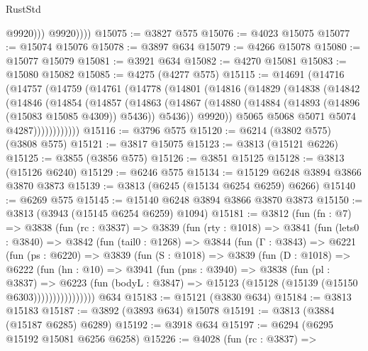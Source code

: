 \begin{lexlean}{RustStd}
\begin{coremodule}
{\begin{coremodule}
{{{{{{{{{{{{{{{{{{{{{{{{{{{{{{{{{{{                  @9920)))
            @9920))))
@15075 := @3827 @575
@15076 := @4023 @15075
@15077 := @15074 @15076
@15078 := @3897 @634
@15079 := @4266 @15078
@15080 := @15077 @15079
@15081 := @3921 @634
@15082 := @4270 @15081
@15083 := @15080 @15082
@15085 := @4275 (@4277 @575)
@15115 := @14691
    (@14716
      (@14757
        (@14759
          (@14761
            (@14778
              (@14801
                (@14816
                  (@14829
                    (@14838
                      (@14842
                        (@14846
                          (@14854
                            (@14857
                              (@14863
                                (@14867
                                  (@14880
                                    (@14884 (@14893 (@14896 (@15083 @15085 @4309)) @5436))
                                    @5436))
                                @9920))
                            @5065
                            @5068
                            @5071
                            @5074
                            @4287))))))))))))
@15116 := @3796 @575
@15120 := @6214 (@3802 @575) (@3808 @575)
@15121 := @3817 @15075
@15123 := @3813 (@15121 @6226)
@15125 := @3855 (@3856 @575)
@15126 := @3851 @15125
@15128 := @3813 (@15126 @6240)
@15129 := @6246 @575
@15134 := @15129 @6248 @3894 @3866 @3870 @3873
@15139 := @3813 (@6245 (@15134 @6254 @6259) @6266)
@15140 := @6269 @575
@15145 := @15140 @6248 @3894 @3866 @3870 @3873
@15150 := @3813 (@3943 (@15145 @6254 @6259) @1094)
@15181 := @3812
    (fun (fn : @7) =>
    @3838
      (fun (rc : @3837) =>
      @3839
        (fun (rty : @1018) =>
        @3841
          (fun (lets0 : @3840) =>
          @3842
            (fun (tail0 : @1268) =>
            @3844
              (fun (Γ : @3843) =>
              @6221
                (fun (ps : @6220) =>
                @3839
                  (fun (S : @1018) =>
                  @3839
                    (fun (D : @1018) =>
                    @6222
                      (fun (hn : @10) =>
                      @3941
                        (fun (pns : @3940) =>
                        @3838
                          (fun (pl : @3837) =>
                          @6223
                            (fun (bodyL : @3847) =>
                            @15123 (@15128 (@15139 (@15150 @6303))))))))))))))))
    @634
@15183 := @15121 (@3830 @634)
@15184 := @3813 @15183
@15187 := @3892 (@3893 @634) @15078
@15191 := @3813 (@3884 (@15187 @6285) @6289)
@15192 := @3918 @634
@15197 := @6294 (@6295 @15192 @15081 @6256 @6258)
@15226 := @4028
    (fun (rc : @3837) =>
}}}}}}}}}}}}}}}}}}}}}}}}}}}}}}}}}}}
\end{coremodule}}
\end{coremodule}
\end{lexlean}
